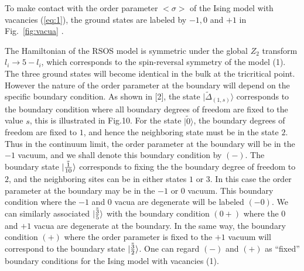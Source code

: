 \documentclass[12pt]{article}
\begin{document}
To make contact with the order parameter $<\sigma>$ of the Ising model
with vacancies (\ref{eq:1}),  the ground states are labeled by $-1, 0$
and $+1$ in Fig.~\ref{fig:vacua} \cite{chim1996boundary}.



The Hamiltonian of the RSOS model is symmetric under
the global $Z_2$ transform $l_i \to 5 - l_i$, which corresponds to the
spin-reversal symmetry of the model (1). The three ground states will
become identical in the bulk at the tricritical point. However the nature
of the order parameter at the boundary will depend on the specific boundary
condition. As shown in [2], the state $|\tilde{\Delta}_{(1,s)}\rangle$ corresponds
to the
boundary condition where all boundary degrees of freedom are fixed to the
value $s$, this is illustrated in Fig.10.
For the state $|\tilde{0}\rangle$, the boundary degrees of freedom are fixed to
$1$, and hence the neighboring state must be in the state $2$. Thus in
the continuum limit, the order parameter at the boundary will be in the $-1$
vacuum, and we shall denote this boundary condition by $(-)$. The boundary
state $|\tilde{1\over10}\rangle$ corresponds to fixing the the boundary degree
of freedom to $2$, and the neighboring sites can be in either states $1$ or
$3$. In this case the order parameter at the boundary may be in the $-1$ or
$0$ vacuum. This boundary condition where the $-1$ and $0$ vacua are
degenerate will be labeled $(-0)$.
We can similarly associated $|\tilde{3\over5}\rangle$ with the boundary condition
$(0+)$ where the $0$ and $+1$ vacua are degenerate at the boundary. In the
same way, the boundary condition $(+)$ where the order parameter is fixed to
the $+1$ vacuum will correspond to the boundary state $|\tilde{3\over2}\rangle$.
One can regard $(-)$ and $(+)$ as ``fixed'' boundary conditions for the
Ising model with vacancies (1).
\end{document}
